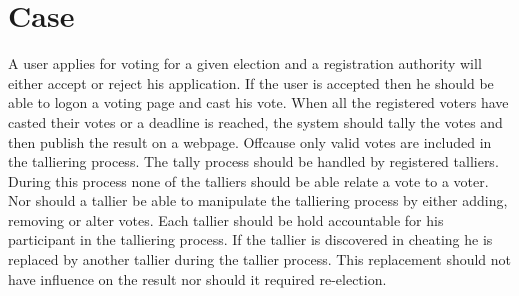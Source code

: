 \section{Case}
A user applies for voting for a given election and a registration authority will either accept or reject his application.  If the user is accepted then he should be able to logon a voting page and cast his vote.  When all the registered voters have casted their votes or a deadline is reached, the system should tally the votes and then publish the result on a webpage. Offcause only valid votes are included in the talliering process. The tally process should be handled by registered talliers. During this process none of the talliers should be able relate a  vote to a voter. Nor should a tallier be able to manipulate the talliering process by either adding, removing or alter votes. Each tallier should be hold accountable for his participant in the talliering process. If the tallier is discovered in cheating he is replaced by another tallier during the tallier process. This replacement should not have influence on the result nor should it required re-election. 